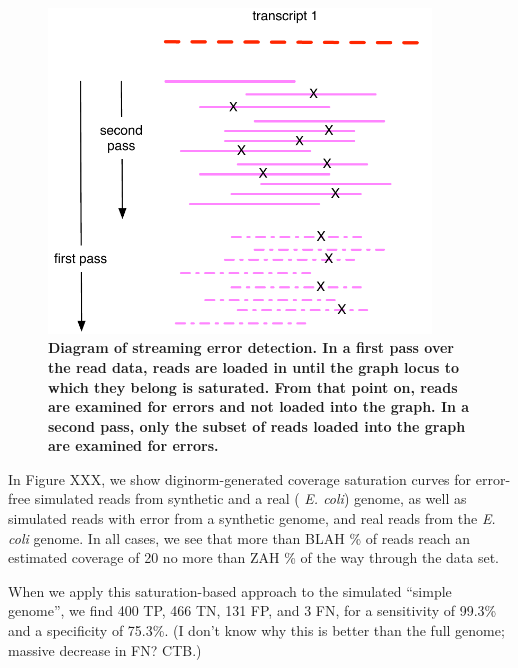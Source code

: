 \documentclass{article}
\begin{document}
\begin{figure}[!ht]
 \centerline{\includegraphics[width=4in]{./figures/graph-saturation}}
\caption{\bf Diagram of streaming error detection. In a first pass
over the read data, reads are loaded in until the graph locus to which
they belong is saturated.  From that point on, reads are examined for
errors and not loaded into the graph.  In a second pass, only the subset
of reads loaded into the graph are examined for errors.}
\label{fig:bar}
\end{figure}


In Figure XXX, we show diginorm-generated coverage saturation curves
for error-free simulated reads from synthetic and a real ({\em
  E. coli}) genome, as well as simulated reads with error from a
synthetic genome, and real reads from the {\em E. coli} genome.  In
all cases, we see that more than BLAH \% of reads reach an estimated
coverage of 20 no more than ZAH \% of the way through the data set.



When we apply this saturation-based approach to the simulated ``simple
genome'', we find 400 TP, 466 TN, 131 FP, and 3 FN, for a sensitivity
of 99.3\% and a specificity of 75.3\%.  (I don't know why this is better
than the full genome; massive decrease in FN? CTB.)

\end{document}
